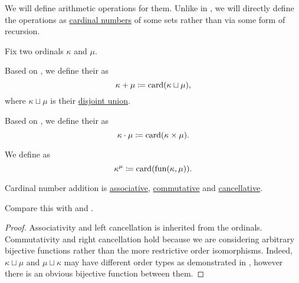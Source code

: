 \begin{definition}\label{def:cardinal_arithmetic}
  We will define arithmetic operations for them. Unlike in , we will directly define the operations as \hyperref[thm:cardinality_existence]{cardinal numbers} of some sets rather than via some form of recursion.

  Fix two ordinals \( \kappa \) and \( \mu \).
  \begin{thmenum}
     Based on , we define their  as
    \begin{equation*}
      \kappa + \mu \coloneqq \operatorname{card}(\kappa \sqcup \mu),
    \end{equation*}
    where \( \kappa \sqcup \mu \) is their \hyperref[def:disjoint_union]{disjoint union}.

     Based on , we define their  as
    \begin{equation*}
      \kappa \cdot \mu \coloneqq \operatorname{card}(\kappa \times \mu).
    \end{equation*}

     We define  as
    \begin{equation*}
      \kappa^\mu \coloneqq \operatorname{card}(\operatorname{fun}(\kappa, \mu)).
    \end{equation*}
  \end{thmenum}
\end{definition}

\begin{proposition}\label{thm:cardinal_addition_algebraic_properties}
  Cardinal number addition is \hyperref[def:magma/associative]{associative}, \hyperref[def:magma/associative]{commutative} and \hyperref[def:magma/cancellative]{cancellative}.

  Compare this with  and .
\end{proposition}
\begin{proof}
  Associativity and left cancellation is inherited from the ordinals. Commutativity and right cancellation hold because we are considering arbitrary bijective functions rather than the more restrictive order isomorphisms. Indeed, \( \kappa \sqcup \mu \) and \( \mu \sqcup \kappa \) may have different order types as demonstrated in , however there is an obvious bijective function between them.
\end{proof}

